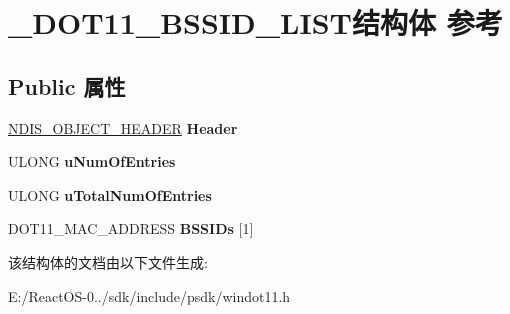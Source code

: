 \hypertarget{struct___d_o_t11___b_s_s_i_d___l_i_s_t}{}\section{\+\_\+\+D\+O\+T11\+\_\+\+B\+S\+S\+I\+D\+\_\+\+L\+I\+S\+T结构体 参考}
\label{struct___d_o_t11___b_s_s_i_d___l_i_s_t}
\subsection*{Public 属性}
\begin{DoxyCompactItemize}
\item 
\mbox{\label{struct___d_o_t11___b_s_s_i_d___l_i_s_t_aeb79d97b4c94e0ddbc351f909fbaf7c7}} 
\hyperlink{struct___n_d_i_s___o_b_j_e_c_t___h_e_a_d_e_r}{N\+D\+I\+S\+\_\+\+O\+B\+J\+E\+C\+T\+\_\+\+H\+E\+A\+D\+ER} {\bfseries Header}
\item 
\mbox{\label{struct___d_o_t11___b_s_s_i_d___l_i_s_t_a217c83bfe518e398928f934e8d37a9e2}} 
U\+L\+O\+NG {\bfseries u\+Num\+Of\+Entries}
\item 
\mbox{\label{struct___d_o_t11___b_s_s_i_d___l_i_s_t_a14427989606d9bd4bac3462cc97dc6b5}} 
U\+L\+O\+NG {\bfseries u\+Total\+Num\+Of\+Entries}
\item 
\mbox{\label{struct___d_o_t11___b_s_s_i_d___l_i_s_t_a99ffec9ed923d76ea85e0db48e0fe7a3}} 
D\+O\+T11\+\_\+\+M\+A\+C\+\_\+\+A\+D\+D\+R\+E\+SS {\bfseries B\+S\+S\+I\+Ds} \mbox{[}1\mbox{]}
\end{DoxyCompactItemize}


该结构体的文档由以下文件生成\+:\begin{DoxyCompactItemize}
\item 
E\+:/\+React\+O\+S-\/0../sdk/include/psdk/windot11.\+h\end{DoxyCompactItemize}
